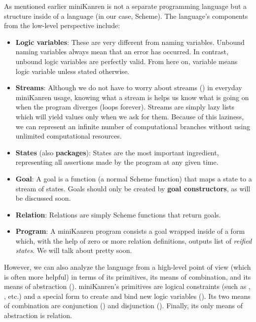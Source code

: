 As mentioned earlier miniKanren is not a separate programming language but a structure inside of a language (in our case, Scheme). The language's components from the low-level perspective include:
\begin{itemize}
\item \textbf{Logic variables}: These are very different from naming variables. Unbound naming variables always mean that an error has occurred. In contrast, unbound logic variables are perfectly valid. From here on, variable means logic variable unless stated otherwise.
\item \textbf{Streams}: Although we do not have to worry about streams (\cite{sicp}) in everyday miniKanren usage, knowing what a stream is helps us know what is going on when the program diverges (loops forever). Streams are simply lazy lists which will yield values only when we ask for them. Because of this laziness, we can represent an infinite number of computational branches without using unlimited computational resources.
\item \textbf{States} (also \textbf{packages}): States are the most important ingredient, representing all assertions made by the program at any given time.
\item \textbf{Goal}: A goal is a function (a normal Scheme function) that maps a state to a stream of states. Goals should only be created by \textbf{goal constructors}, as will be discussed soon.
\item \textbf{Relation}: Relations are simply Scheme functions that return goals.
\item \textbf{Program}: A miniKanren program consists a goal wrapped inside of a  form which, with the help of zero or more relation definitions, outputs list of \textit{reified states}. We will talk about  pretty soon.
\end{itemize}

However, we can also analyze the language from a high-level point of view (which is often more helpful) in terms of its primitives, its means of combination, and its means of abstraction (\cite[359]{sicp}). miniKanren's primitives are logical constraints (such as \code{==}, \code{=/=}, etc.) and a special form to create and bind new logic variables (). Its two means of combination are conjunction () and disjunction (). Finally, its only means of abstraction is relation.

